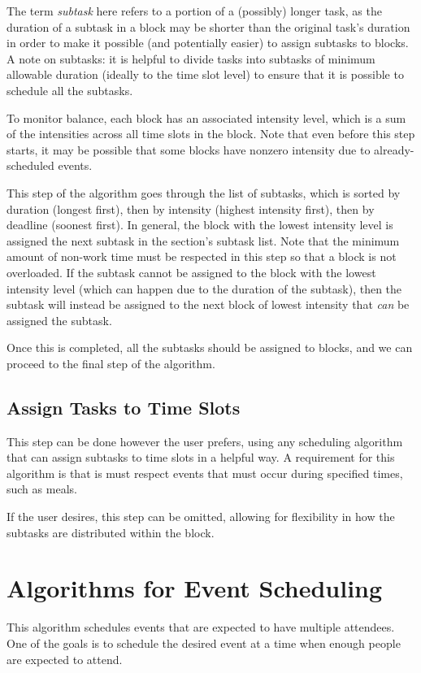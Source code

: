 \documentclass{article}
\begin{document}
		The term \emph{subtask} here refers to a portion of a (possibly) longer task, as the duration of a subtask in a block may be shorter than the original task's duration in order to make it possible (and potentially easier) to assign subtasks to blocks.
		A note on subtasks: it is helpful to divide tasks into subtasks of minimum allowable duration (ideally to the time slot level) to ensure that it is possible to schedule all the subtasks.
		
		To monitor balance, each block has an associated intensity level, which is a sum of the intensities across all time slots in the block.
		Note that even before this step starts, it may be possible that some blocks have nonzero intensity due to already-scheduled events.
		
		This step of the algorithm goes through the list of subtasks, which is sorted by duration (longest first), then by intensity (highest intensity first), then by deadline (soonest first).
		In general, the block with the lowest intensity level is assigned the next subtask in the section's subtask list.
		Note that the minimum amount of non-work time must be respected in this step so that a block is not overloaded.
		If the subtask cannot be assigned to the block with the lowest intensity level (which can happen due to the duration of the subtask), then the subtask will instead be assigned to the next block of lowest intensity that \emph{can} be assigned the subtask.
		
		Once this is completed, all the subtasks should be assigned to blocks, and we can proceed to the final step of the algorithm.
		
	\subsection{Assign Tasks to Time Slots}
		This step can be done however the user prefers, using any scheduling algorithm that can assign subtasks to time slots in a helpful way.
		A requirement for this algorithm is that is must respect events that must occur during specified times, such as meals.
		
		If the user desires, this step can be omitted, allowing for flexibility in how the subtasks are distributed within the block.
		
		
		
\section{Algorithms for Event Scheduling}
	This algorithm schedules events that are expected to have multiple attendees.
	One of the goals is to schedule the desired event at a time when enough people are expected to attend.
\end{document}
